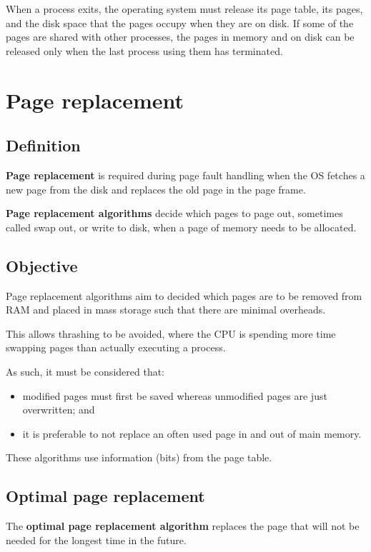\documentclass[a4paper]{systems-software}
\begin{document}
When a process exits, the operating system must release its page table, its pages, and the disk space that the pages occupy when they are on disk. If some of the pages are shared with other processes, the pages in memory and on disk can be released only when the last process using them has terminated.


\section*{Page replacement}

\subsection*{Definition}

\textbf{Page replacement} is required during page fault handling when the OS fetches a new page from the disk and replaces the old page in the page frame.

\textbf{Page replacement algorithms} decide which pages to page out, sometimes called swap out, or write to disk, when a page of memory needs to be allocated.


\subsection*{Objective}

Page replacement algorithms aim to decided which pages are to be removed from RAM and placed in mass storage such that there are minimal overheads.

This allows thrashing to be avoided, where the CPU is spending more time swapping pages than actually executing a process.

As such, it must be considered that:
\begin{itemize}
	\item modified pages must first be saved whereas unmodified pages are just overwritten; and
	\item it is preferable to not replace an often used page in and out of main memory.
\end{itemize}

These algorithms use information (bits) from the page table.


\subsection*{Optimal page replacement}

The \textbf{optimal page replacement algorithm} replaces the page that will not be needed for the longest time in the future.
\end{document}
